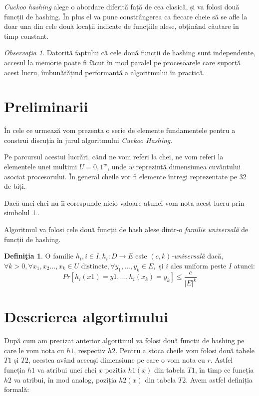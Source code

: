 \documentclass[a4paper]{article}
\theoremstyle{remark}
\newtheorem{remark}{Observa\c{t}ia}
\theoremstyle{definition}
\newtheorem{definition}{Defini\c{t}ia}[section]
\begin{document}
\textit{Cuckoo hashing} alege o abordare diferită față de cea clasică, și va folosi două funcții de hashing. În plus el va pune constrângerea ca fiecare cheie să se afle la doar una din cele două locații indicate de funcțiile alese, obținând căutare în timp constant. 

\begin{remark}
Datorită faptului că cele două funcții de hashing sunt independente, accesul la memorie poate fi făcut în mod paralel pe procesoarele care suportă acest lucru, îmbunătățind performanță a algoritmului în practică.
\end{remark}

\section {Preliminarii}

În cele ce urmează vom prezenta o serie de elemente fundamentele pentru a construi discuția în jurul algoritmului \textit{Cuckoo Hashing}.

Pe parcursul acestui lucrări, când ne vom referi la chei, ne vom referi la elementele unei mulțimi $U = {0,1}^w$, unde $w$ reprezintă dimensiunea cuvântului asociat procesorului. În general cheile vor fi elemente întregi reprezentate pe 32 de biți.

Dacă unei chei nu îi corespunde nicio valoare atunci vom nota acest lucru prin simbolul $\bot$.

Algoritmul va folosi cele două funcții de hash alese dintr-o \textit{familie universală} de funcții de hashing.

\begin{definition}
O familie  $h_i, i \in I, h_i:D \to E$  este \textit{$(c,k)$-universală} dacă, $\forall k > 0, \forall x_1, x_2 ..., x_k \in U \text{ distincte}, \forall y_1, ..., y_k \in E,$ și $i$ ales uniform peste $I$ atunci: \\ \[Pr[h_i(x1) = y1, ..., h_i(x_k) = y_k] \leq \frac{c}{|E|^k}\]
\end{definition}

\section {Descrierea algortimului}

După cum am precizat anterior algoritmul va folosi două funcții de hashing pe care le vom nota cu $h1$, respectiv $h2$. Pentru a stoca cheile vom folosi două tabele $T1$ și $T2$, acestea având aceeași dimensiune pe care o vom nota cu $r$. Astfel funcția $h1$ va atribui unei chei $x$ poziția $h1(x)$ din tabela $T1$, în timp ce funcția $h2$ va atribui, în mod analog, poziția $h2(x)$ din tabela $T2$. Avem astfel definiția formală:
\end{document}
